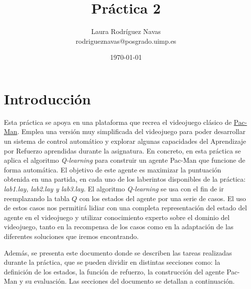 \documentclass[11pt]{exam}
\title{Práctica 2}
\author{Laura Rodríguez Navas \\ rodrigueznavas@posgrado.uimp.es}
\date{{\selectlanguage{spanish}\today} }
\begin{document}
	
\maketitle

\renewcommand{\tablename}{Tabla}
\renewcommand{\lstlistingname}{Código}

\section{Introducción}\label{introduccion}

Esta práctica se apoya en una plataforma que recrea el videojuego clásico de \href{1https://en.wikipedia.org/wiki/Pac-Man}{Pac-Man}. Emplea una versión muy simplificada del videojuego para poder desarrollar un sistema de control automático y explorar algunas capacidades del Aprendizaje por Refuerzo aprendidas durante la asignatura. En concreto, en esta práctica se aplica el algoritmo \textit{Q-learning} para construir un agente Pac-Man que funcione de forma automática. El objetivo de este agente es maximizar la puntuación obtenida en una partida, en cada uno de los laberintos disponibles de la práctica: \textit{lab1.lay, lab2.lay y lab3.lay}. El algoritmo \textit{Q-learning} se usa con el fin de ir reemplazando la tabla $Q$ con los estados del agente por una serie de casos. El uso de estos casos nos permitirá lidiar con una completa representación del estado del agente en el videojuego y utilizar conocimiento experto sobre el dominio del videojuego, tanto en la recompensa de los casos como en la adaptación de las diferentes soluciones que iremos encontrando. 
\vspace*{2mm}

Además, se presenta este documento donde se describen las tareas realizadas durante la práctica, que se pueden dividir en distintas secciones como: la definición de los estados, la función de refuerzo, la construcción del agente Pac-Man y su evaluación. Las secciones del documento se detallan a continuación.
\vspace*{2mm}
\end{document}
